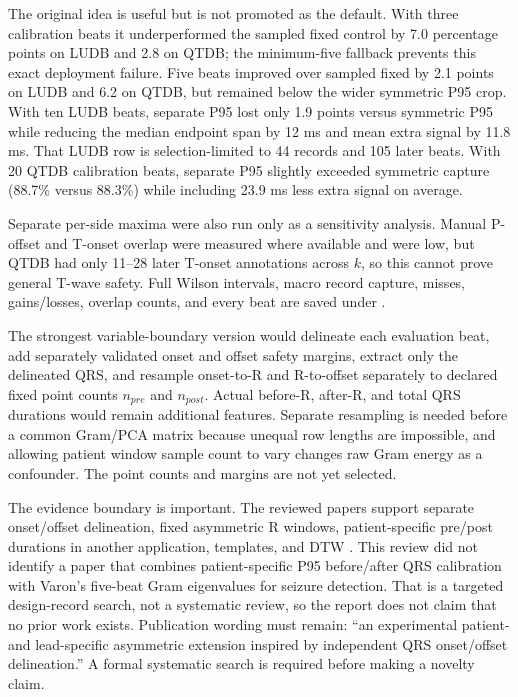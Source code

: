 \documentclass[11pt,a4paper]{article}
\newcommand{\pathcode}[1]{\texttt{\detokenize{#1}}}
\begin{document}
The original idea is useful but is not promoted as the default. With three
calibration beats it underperformed the sampled fixed control by 7.0 percentage
points on LUDB and 2.8 on QTDB; the minimum-five fallback prevents this exact
deployment failure. Five beats improved over sampled fixed by 2.1 points on
LUDB and 6.2 on QTDB, but remained below the wider symmetric P95 crop. With ten
LUDB beats, separate P95 lost only 1.9 points versus symmetric P95 while
reducing the median endpoint span by 12 ms and mean extra signal by 11.8 ms.
That LUDB row is selection-limited to 44 records and 105 later beats. With 20
QTDB calibration beats, separate P95 slightly exceeded symmetric capture
(88.7\% versus 88.3\%) while including 23.9 ms less extra signal on average.

Separate per-side maxima were also run only as a sensitivity analysis. Manual
P-offset and T-onset overlap were measured where available and were low, but
QTDB had only 11--28 later T-onset annotations across $k$, so this cannot prove
general T-wave safety. Full Wilson intervals, macro record capture, misses,
gains/losses, overlap counts, and every beat are saved under
\pathcode{outputs/patient_asymmetric_varon_capture_v3/}.

The strongest variable-boundary version would delineate each evaluation beat,
add separately validated onset and offset safety margins, extract only the
delineated QRS, and resample onset-to-R and R-to-offset separately to declared
fixed point counts $n_{pre}$ and $n_{post}$. Actual before-R, after-R, and total
QRS durations would remain additional features. Separate resampling is needed
before a common Gram/PCA matrix because unequal row lengths are impossible,
and allowing patient window sample count to vary changes raw Gram energy as a
confounder. The point counts and margins are not yet selected.

The evidence boundary is important. The reviewed papers support separate
onset/offset delineation, fixed asymmetric R windows, patient-specific
pre/post durations in another application, templates, and DTW
\cite{martinez2004,illanes2007,singh2013,lorenz2021,adaptiveqrs}. This review did
not identify a paper that combines patient-specific P95 before/after QRS
calibration with Varon's five-beat Gram eigenvalues for seizure detection.
That is a targeted design-record search, not a systematic review, so the report
does not claim that no prior work exists. Publication wording must remain:
``an experimental patient- and lead-specific asymmetric extension inspired by
independent QRS onset/offset delineation.'' A formal systematic search is
required before making a novelty claim.
\end{document}
